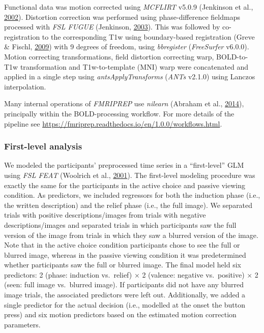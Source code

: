 \documentclass[11pt,american,a4paper,oneside,]{memoir} %
\begin{document}
Functional data was motion corrected using \emph{MCFLIRT} v5.0.9 (Jenkinson et al., \protect\hyperlink{ref-Jenkinson2002-wm}{2002}). Distortion correction was performed using phase-difference fieldmaps processed with \emph{FSL FUGUE} (Jenkinson, \protect\hyperlink{ref-jenkinson2003fast}{2003}). This was followed by co-registration to the corresponding T1w using boundary-based registration (Greve \& Fischl, \protect\hyperlink{ref-Greve2009-da}{2009}) with 9 degrees of freedom, using \emph{bbregister} (\emph{FreeSurfer} v6.0.0). Motion correcting transformations, field distortion correcting warp, BOLD-to-T1w transformation and T1w-to-template (MNI) warp were concatenated and applied in a single step using \emph{antsApplyTransforms} (\emph{ANTs} v2.1.0) using Lanczos interpolation.

Many internal operations of \emph{FMRIPREP} use \emph{nilearn} (Abraham et al., \protect\hyperlink{ref-Abraham2014-ef}{2014}), principally within the BOLD-processing workflow. For more details of the pipeline see \url{https://fmriprep.readthedocs.io/en/1.0.0/workflows.html}.

\hypertarget{morbid-curiosity-methods-imaging-first-level-analysis}{%
\subsubsection{First-level analysis}\label{morbid-curiosity-methods-imaging-first-level-analysis}}

We modeled the participants' preprocessed time series in a ``first-level'' GLM using \emph{FSL FEAT} (Woolrich et al., \protect\hyperlink{ref-woolrich2001temporal}{2001}). The first-level modeling procedure was exactly the same for the participants in the active choice and passive viewing condition. As predictors, we included regressors for both the induction phase (i.e., the written description) and the relief phase (i.e., the full image). We separated trials with positive descriptions/images from trials with negative descriptions/images and separated trials in which participants saw the full version of the image from trials in which they saw a blurred version of the image. Note that in the active choice condition participants chose to see the full or blurred image, whereas in the passive viewing condition it was predetermined whether participants saw the full or blurred image. The final model held six predictors: 2 (phase: induction vs.~relief) × 2 (valence: negative vs.~positive) × 2 (seen: full image vs.~blurred image). If participants did not have any blurred image trials, the associated predictors were left out. Additionally, we added a single predictor for the actual decision (i.e., modelled at the onset the button press) and six motion predictors based on the estimated motion correction parameters.
\end{document}

